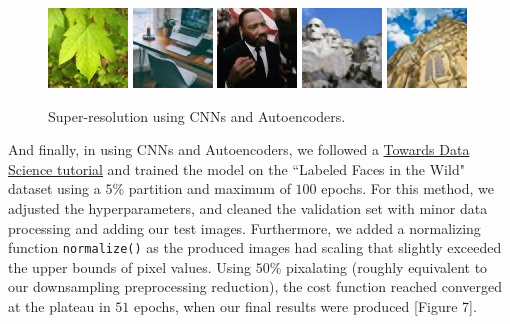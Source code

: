 \documentclass[letterpaper,12pt]{article}
\begin{document}
\begin{figure}[h!]
    \includegraphics[width=.2\textwidth]{cnn-autoencoders/green-maple-leaf.jpg}\hfill
    \includegraphics[width=.2\textwidth]{cnn-autoencoders/home-office.jpg}\hfill
    \includegraphics[width=.2\textwidth]{cnn-autoencoders/martin-luther-king.jpg}\hfill
    \includegraphics[width=.2\textwidth]{cnn-autoencoders/mount-rushmore.jpg}\hfill
    \includegraphics[width=.2\textwidth]{cnn-autoencoders/salisbury-cathedral.jpg}
    \caption{Super-resolution using CNNs and Autoencoders.}
\end{figure}

And finally, in using CNNs and Autoencoders, we followed a \href{https://towardsdatascience.com/image-super-resolution-using-convolution-neural-networks-and-auto-encoders-28c9eceadf90}{Towards Data Science tutorial} \cite{PatelH} and trained the model on the ``Labeled Faces in the Wild" dataset \cite{LFWTech} \cite{LFWTechUpdate} using a $5$\% partition and maximum of $100$ epochs. For this method, we adjusted the hyperparameters, and cleaned the validation set with minor data processing and adding our test images. Furthermore, we added a normalizing function \texttt{normalize()} as the produced images had scaling that slightly exceeded the upper bounds of pixel values. Using $50$\% pixalating (roughly equivalent to our downsampling preprocessing reduction), the cost function reached converged at the plateau in $51$ epochs, when our final results were produced [Figure 7].
\end{document}
